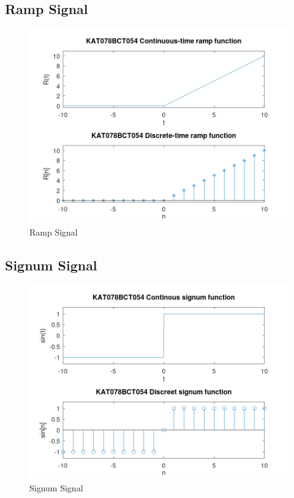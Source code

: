 \subsection*{Ramp Signal}
    
    \begin{figure}[h]
        \centering
        \includegraphics[width=0.7\linewidth]{figures/ramp.png}
        \caption{Ramp Signal}
        \label{ramp}
    \end{figure}
\newpage
\subsection*{Signum Signal}
    
    \begin{figure}[h]
        \centering
        \includegraphics[width=0.7\linewidth]{figures/sgn.png}
        \caption{Signum Signal}
        \label{sgn}
    \end{figure}
\newpage
